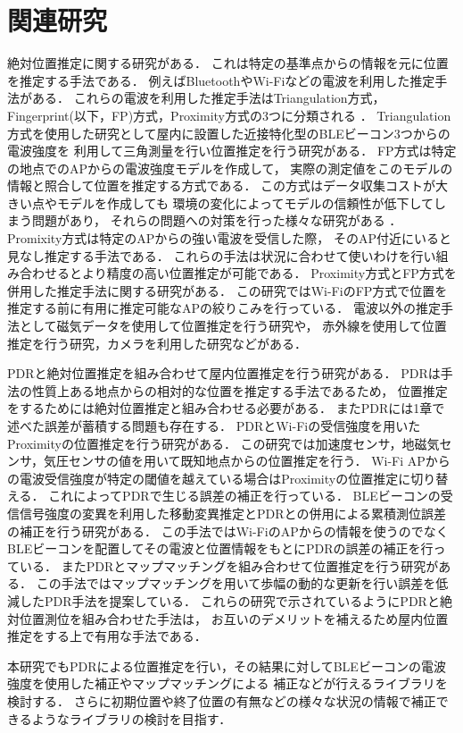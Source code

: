 

\section{関連研究}
絶対位置推定に関する研究がある．
これは特定の基準点からの情報を元に位置を推定する手法である．
例えばBluetoothやWi-Fiなどの電波を利用した推定手法がある．
これらの電波を利用した推定手法はTriangulation方式，Fingerprint(以下，FP)方式，Proximity方式の3つに分類される
\cite{wireless-lan-summary}．
Triangulation方式を使用した研究として屋内に設置した近接特化型のBLEビーコン3つからの電波強度を
利用して三角測量を行い位置推定を行う研究がある\cite{ble-indoor}\cite{ble-tandem}\cite{triangulation-kalman}．
FP方式は特定の地点でのAPからの電波強度モデルを作成して，
実際の測定値をこのモデルの情報と照合して位置を推定する方式である．
この方式はデータ収集コストが大きい点やモデルを作成しても
環境の変化によってモデルの信頼性が低下してしまう問題があり，
それらの問題への対策を行った様々な研究がある
\cite{gaussian-mixture-model}
\cite{wireless-lan-cost-reduction}
\cite{fingerprint-auto-update}
\cite{wi-fi-fingerprint-domain}．
Promixity方式は特定のAPからの強い電波を受信した際，
そのAP付近にいると見なし推定する手法である．
これらの手法は状況に合わせて使いわけを行い組み合わせるとより精度の高い位置推定が可能である．
Proximity方式とFP方式を併用した推定手法に関する研究がある\cite{proximity-fingerprint}．
この研究ではWi-FiのFP方式で位置を推定する前に有用に推定可能なAPの絞りこみを行っている．
電波以外の推定手法として磁気データを使用して位置推定を行う研究\cite{pdr-mag}や，
赤外線を使用して位置推定を行う研究\cite{infrared}，カメラを利用した研究\cite{camera}などがある．

PDRと絶対位置推定を組み合わせて屋内位置推定を行う研究がある．
PDRは手法の性質上ある地点からの相対的な位置を推定する手法であるため，
位置推定をするためには絶対位置推定と組み合わせる必要がある．
またPDRには1章で述べた誤差が蓄積する問題も存在する．
PDRとWi-Fiの受信強度を用いたProximityの位置推定を行う研究\cite{pdr-wifi}がある．
この研究では加速度センサ，地磁気センサ，気圧センサの値を用いて既知地点からの位置推定を行う．
Wi-Fi APからの電波受信強度が特定の閾値を越えている場合はProximityの位置推定に切り替える．
これによってPDRで生じる誤差の補正を行っている．
BLEビーコンの受信信号強度の変異を利用した移動変異推定とPDRとの併用による累積測位誤差の補正を行う研究\cite{pdr-ble}がある．
この手法ではWi-FiのAPからの情報を使うのでなくBLEビーコンを配置してその電波と位置情報をもとにPDRの誤差の補正を行っている．
またPDRとマップマッチングを組み合わせて位置推定を行う研究\cite{pdr-map}がある．
この手法ではマップマッチングを用いて歩幅の動的な更新を行い誤差を低減したPDR手法を提案している．
これらの研究で示されているようにPDRと絶対位置測位を組み合わせた手法は，
お互いのデメリットを補えるため屋内位置推定をする上で有用な手法である．

本研究でもPDRによる位置推定を行い，その結果に対してBLEビーコンの電波強度を使用した補正やマップマッチングによる
補正などが行えるライブラリを検討する．
さらに初期位置や終了位置の有無などの様々な状況の情報で補正できるようなライブラリの検討を目指す．


